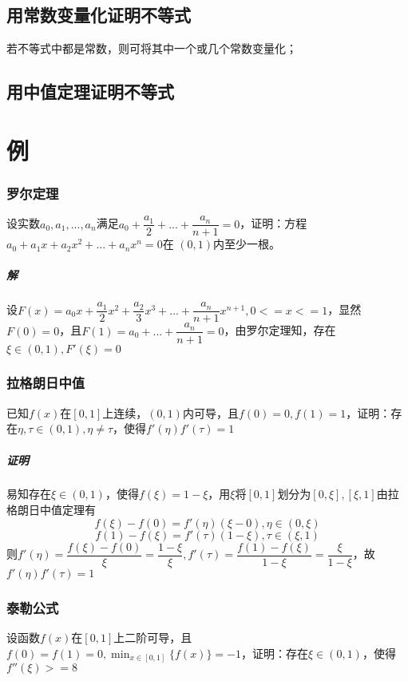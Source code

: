 \subsection{用常数变量化证明不等式}
若不等式中都是常数，则可将其中一个或几个常数变量化；


\subsection{用中值定理证明不等式}


\section{例}

\subsubsection{罗尔定理}
设实数\(a_0, a_1, ..., a_n\)满足\(a_0 + \dfrac{a_1}{2} + ... + \dfrac{a_n}{n + 1} = 0\)，证明：方程\(a_0 + a_1x + a_2x^2 + ... + a_nx^n = 0\)在 \((0, 1)\)内至少一根。

\subparagraph{解}
设\(F(x) = a_0x + \dfrac{a_1}{2}x^2 + \dfrac{a_2}{3}x^3 + ... + \dfrac{a_n}{n + 1}x^{n + 1}, 0 <= x <= 1\)，显然\(F(0) = 0\)，且\(F(1) = a_0 + ... + \dfrac{a_n}{n + 1} = 0\)，由罗尔定理知，存在\(\xi \in (0, 1), F'(\xi) = 0\)


\subsubsection{拉格朗日中值}
已知\(f(x)\)在\([0, 1]\)上连续，\((0, 1)\)内可导，且\(f(0) = 0, f(1) = 1\)，证明：存在\(\eta, \tau \in (0, 1), \eta \neq \tau\)，使得\(f'(\eta)f'(\tau) = 1\)

\subparagraph{证明}
易知存在\(\xi \in (0, 1)\)，使得\(f(\xi) = 1 - \xi\)，用\(\xi\)将\([0, 1]\)划分为\([0, \xi], [\xi, 1]\)由拉格朗日中值定理有\[f(\xi) - f(0) = f'(\eta)(\xi - 0), \eta \in (0, \xi)\]
\[f(1) - f(\xi) = f'(\tau)(1 - \xi), \tau \in (\xi, 1)\]
则\(f'(\eta) = \dfrac{f(\xi) - f(0)}{\xi} = \dfrac{1 - \xi}{\xi}, f'(\tau) = \dfrac{f(1) - f(\xi)}{1 - \xi} = \dfrac{\xi}{1 - \xi}\)，故\(f'(\eta)f'(\tau) = 1\)


\subsubsection{泰勒公式}
设函数\(f(x)\)在\([0, 1]\)上二阶可导，且\(f(0) = f(1) = 0, \displaystyle \min_{x \in [0, 1]}\{f(x)\} = -1\)，证明：存在\(\xi \in (0, 1)\)，使得\(f''(\xi) >= 8\)


